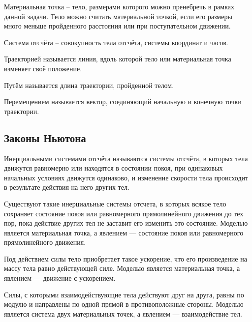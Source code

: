 \documentclass[12pt]{article}
\begin{document}
\begin{definition}
    Материальная точка – тело, размерами которого можно пренебречь в рамках данной задачи. Тело можно считать материальной точкой, если его размеры много меньше пройденного расстояния или при поступательном движении.
\end{definition}
\begin{definition}
    Система отсчёта – совокупность тела отсчёта, системы координат и часов.
\end{definition}
\begin{definition}
    Траекторией называется линия, вдоль которой тело или материальная точка изменяет своё положение.
\end{definition}
\begin{definition}
    Путём называется длина траектории, пройденной телом.
\end{definition}
\begin{definition}
    Перемещением называется вектор, соединяющий начальную и конечную точки траектории.
\end{definition}

\subsection{Законы Ньютона}

\begin{definition}
    Инерциальными системами отсчёта называются системы отсчёта, в которых тела движутся равномерно или находятся в состоянии покоя, при одинаковых начальных условиях движутся одинаково, и изменение скорости тела происходит в результате действия на него других тел.
\end{definition}

\begin{law}
    Существуют такие инерциальные системы отсчета, в которых всякое тело сохраняет состояние покоя или равномерного прямолинейного движения до тех пор, пока действие других тел не заставит его изменить это состояние. Моделью является материальная точка, а явлением — состояние покоя или равномерного прямолинейного движения.
\end{law}
\begin{law}
    Под действием силы тело приобретает такое ускорение, что его произведение на массу тела равно действующей силе. Моделью является материальная точка, а явлением — движение с ускорением.
\end{law}
\begin{law}
    Силы, с которыми взаимодействующие тела действуют друг на друга, равны по модулю и направлены по одной прямой в противоположные стороны. Моделью является система двух материальных точек, а явлением — взаимодействие тел.
\end{law}
\end{document}
